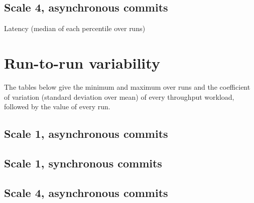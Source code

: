\subsection{Scale 4, asynchronous commits}

\begin{center}\footnotesize\end{center}

\begin{center}\footnotesize Latency (median of each percentile over runs)\\[2pt]\end{center}

\begin{center}\footnotesize\end{center}

\begin{center}\footnotesize\end{center}

\clearpage
\section{Run-to-run variability}
\label{app:variability}

The tables below give the minimum and maximum over runs and the coefficient of variation (standard deviation over mean) of every throughput workload, followed by the value of every run.

\subsection{Scale 1, asynchronous commits}
\begin{center}\footnotesize\end{center}
{\footnotesize}

\subsection{Scale 1, synchronous commits}
\begin{center}\footnotesize\end{center}
{\footnotesize}

\subsection{Scale 4, asynchronous commits}
\begin{center}\footnotesize\end{center}
{\footnotesize}

